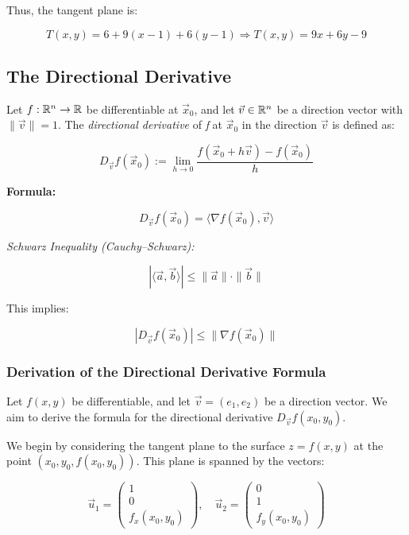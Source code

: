 Thus, the tangent plane is:

\[
    T(x, y) = 6 + 9(x - 1) + 6(y - 1)
    \Rightarrow T(x, y) = 9x + 6y - 9
\]

\subsection{The Directional Derivative}

Let \( f : \mathbb{R}^n \to \mathbb{R} \) be differentiable at \( \vec{x}_0 \), 
and let \( \vec{v} \in \mathbb{R}^n \) be a direction vector with \( \|\vec{v}\| = 1 \). The 
\emph{directional derivative} of \emph{f} at \( \vec{x}_0 \) in the direction \( \vec{v} \) is defined as:

\[
    D_{\vec{v}}f(\vec{x}_0) := \lim_{h \to 0} \frac{f(\vec{x}_0 + h\vec{v}) - f(\vec{x}_0)}{h}
\]

\textbf{Formula:}

\[
    D_{\vec{v}}f(\vec{x}_0) = \langle \nabla f(\vec{x}_0), \vec{v} \rangle
\]

\emph{Schwarz Inequality (Cauchy–Schwarz):}

\[
    |\langle \vec{a}, \vec{b} \rangle| \le \|\vec{a}\| \cdot \|\vec{b}\|
\]

This implies:

\[
    |D_{\vec{v}}f(\vec{x}_0)| \le \|\nabla f(\vec{x}_0)\|
\]

\subsubsection{Derivation of the Directional Derivative Formula}

Let \( f(x, y) \) be differentiable, and let \( \vec{v} = (e_1, e_2) \) be a direction vector. We aim to 
derive the formula for the directional derivative \( D_{\vec{v}} f(x_0, y_0) \).

We begin by considering the tangent plane to the surface \( z = f(x, y) \) at the point 
\( (x_0, y_0, f(x_0, y_0)) \). This plane is spanned by the vectors:

\[
    \vec{u}_1 = 
    \begin{pmatrix}
    1 \\
    0 \\
    f_x(x_0, y_0)
    \end{pmatrix}, \quad
    \vec{u}_2 = 
    \begin{pmatrix}
    0 \\
    1 \\
    f_y(x_0, y_0)
    \end{pmatrix}
\]

